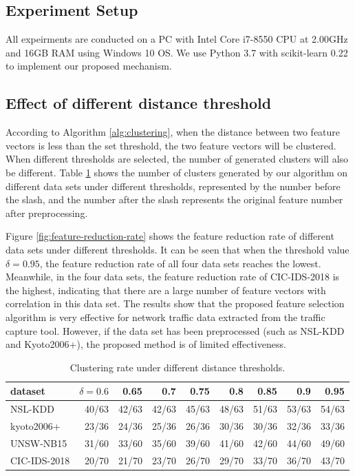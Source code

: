 \documentclass{ieeeaccess}
\theoremstyle{definition}
\begin{document}
\subsection{Experiment Setup}

All expeirments are conducted on a PC with Intel Core i7-8550 CPU at 2.00GHz and 16GB RAM using Windows 10 OS. We use Python 3.7 with scikit-learn 0.22 \cite{sklearn} to implement our proposed mechanism.

\subsection{Effect of different distance threshold}

According to Algorithm \ref{alg:clustering}, when the distance between two feature vectors is less than the set threshold, the two feature vectors will be clustered. When different thresholds are selected, the number of generated clusters will also be different. Table \ref{tab:clustering-rate} shows the number of clusters generated by our algorithm on different data sets under different thresholds, represented by the number before the slash, and the number after the slash represents the original feature number after preprocessing.

Figure \ref{fig:feature-reduction-rate} shows the feature reduction rate of different data sets under different thresholds. It can be seen that when the threshold value $\delta = 0.95$, the feature reduction rate of all four data sets reaches the lowest. Meanwhile, in the four data sets, the feature reduction rate of CIC-IDS-2018 is the highest, indicating that there are a large number of feature vectors with correlation in this data set. The results show that the proposed feature selection algorithm is very effective for network traffic data extracted from the traffic capture tool. However, if the data set has been preprocessed (such as NSL-KDD and Kyoto2006+), the proposed method is of limited effectiveness.

\begin{table}[htbp]
    \centering
    \caption{Clustering rate under different distance thresholds.}
    \begin{tabular}{|l|r|r|r|r|r|r|r|r|}
        \hline
        dataset & $\delta=0.6$ & 0.65 & 0.7 & 0.75 & 0.8 & 0.85 & 0.9 & 0.95 \\
        \hline
        NSL-KDD & 40/63 & 42/63 & 42/63 & 45/63 & 48/63 & 51/63 & 53/63 & 54/63 \\
        \hline
        kyoto2006+ & 23/36 & 24/36 & 25/36 & 26/36 & 30/36 & 30/36 & 32/36 & 33/36 \\
        \hline
        UNSW-NB15 & 31/60 & 33/60 & 35/60 & 39/60 & 41/60 & 42/60 & 44/60 & 49/60 \\
        \hline
        CIC-IDS-2018 & 20/70 & 21/70 & 23/70 & 26/70 & 29/70 & 33/70 & 36/70 & 43/70 \\
        \hline
    \end{tabular}%
    \label{tab:clustering-rate}%
\end{table}%
\end{document}
